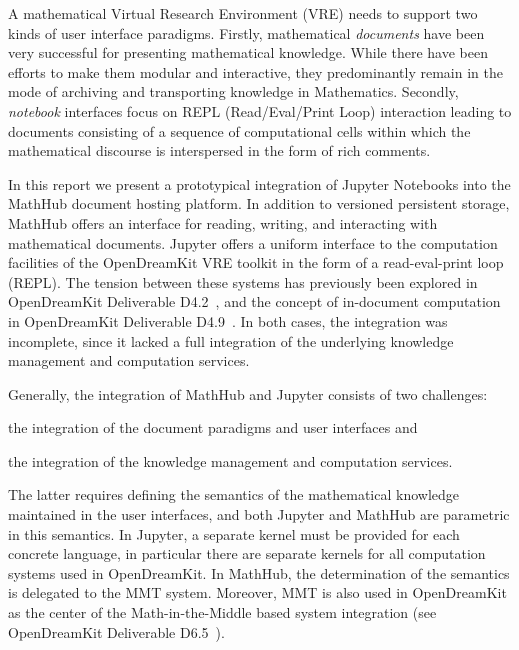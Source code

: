 A mathematical Virtual Research Environment (VRE) needs to support two kinds of user interface paradigms.
Firstly, mathematical \emph{documents} have been very successful for presenting mathematical knowledge.
While there have been efforts to make them modular and interactive, they predominantly remain in the mode of archiving and transporting knowledge in Mathematics.
Secondly, \emph{notebook} interfaces focus on REPL (Read/Eval/Print Loop) interaction leading to documents consisting of a sequence of computational cells within which the mathematical discourse is interspersed in the form of rich comments.

In this report we present a prototypical integration of Jupyter Notebooks into the MathHub document hosting platform.
In addition to versioned persistent storage, MathHub offers an interface for reading, writing, and interacting with mathematical documents.
Jupyter offers a uniform interface to the computation facilities of the OpenDreamKit VRE toolkit in the form of a read-eval-print loop (REPL).
The tension between these systems has previously been explored in OpenDreamKit Deliverable D4.2~\cite{ODK-D4.2}, and the concept of in-document computation in OpenDreamKit Deliverable D4.9~\cite{ODK-D4.9}.
In both cases, the integration was incomplete, since it lacked a full integration of the underlying knowledge management and computation services.

Generally, the integration of MathHub and Jupyter consists of two challenges:
\begin{inparaenum}[\em a\rm )]
\item the integration of the document paradigms and user interfaces and
\item the integration of the knowledge management and computation services.
\end{inparaenum}
The latter requires defining the semantics of the mathematical knowledge maintained in the user interfaces, and both Jupyter and MathHub are parametric in this semantics.
In Jupyter, a separate kernel must be provided for each concrete language, in particular there are separate kernels for all computation systems used in OpenDreamKit.
In MathHub, the determination of the semantics is delegated to the MMT system.
Moreover, MMT is also used in OpenDreamKit as the center of the Math-in-the-Middle based system integration (see OpenDreamKit Deliverable D6.5~\cite{ODK-D6.5}).

